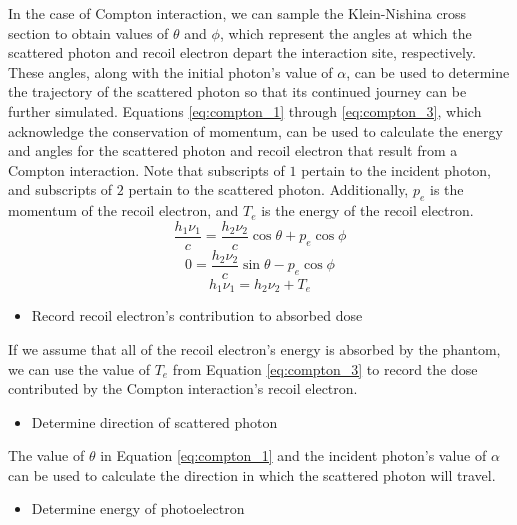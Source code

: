 \documentclass[12pt]{article} %
\begin{document}
In the case of Compton interaction, we can sample the Klein-Nishina cross section to obtain values of $\theta$ and $\phi$, which represent the angles at which the scattered photon and recoil electron depart the interaction site, respectively. These angles, along with the initial photon's value of $\alpha$, can be used to determine the trajectory of the scattered photon so that its continued journey can be further simulated. Equations \ref{eq:compton_1} through \ref{eq:compton_3}, which acknowledge the conservation of momentum, can be used to calculate the energy and angles for the scattered photon and recoil electron that result from a Compton interaction. Note that subscripts of $1$ pertain to the incident photon, and subscripts of $2$ pertain to the scattered photon. Additionally, $p_{e}$ is the momentum of the recoil electron, and $T_{e}$ is the energy of the recoil electron.
\begin{equation}
\frac{h_{1}\nu_{1}}{c} = \frac{h_{2}\nu_{2}}{c}\cos\theta + p_{e}\cos\phi
\label{eq:compton_1}
\end{equation}
\begin{equation}
0 = \frac{h_{2}\nu_{2}}{c}\sin\theta - p_{e}\cos\phi
\label{eq:compton_2}
\end{equation}
\begin{equation}
h_{1}\nu_{1} = h_{2}\nu_{2} + T_{e}
\label{eq:compton_3}
\end{equation}
\begin{itemize}
\item Record recoil electron's contribution to absorbed dose
\end{itemize}

If we assume that all of the recoil electron's energy is absorbed by the phantom, we can use the value of $T_{e}$ from Equation \ref{eq:compton_3} to record the dose contributed by the Compton interaction's recoil electron.

\begin{itemize}
\item Determine direction of scattered photon
\end{itemize}

The value of $\theta$ in Equation \ref{eq:compton_1} and the incident photon's value of $\alpha$ can be used to calculate the direction in which the scattered photon will travel.

\begin{itemize}
\item Determine energy of photoelectron
\end{itemize}
\end{document}
